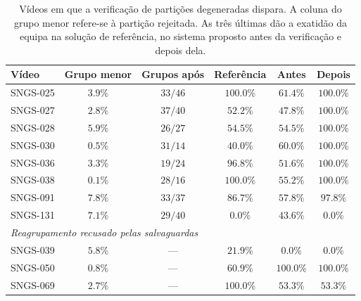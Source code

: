 \begin{table}[htbp]
    \centering
    \caption{Vídeos em que a verificação de partições degeneradas dispara. A coluna do grupo menor refere-se à partição rejeitada. As três últimas dão a exatidão da equipa na solução de referência, no sistema proposto antes da verificação e depois dela.}
    \label{tab:regressoes}
    \begin{tabular}{|l|c|c|c|c|c|}
        \hline
        \textbf{Vídeo} & \textbf{Grupo menor} & \textbf{Grupos após} & \textbf{Referência} & \textbf{Antes} & \textbf{Depois} \\
        \hline
        SNGS-025 & $3.9\%$ & $33/46$ & $100.0\%$ & $61.4\%$ & $100.0\%$ \\
        \hline
        SNGS-027 & $2.8\%$ & $37/40$ & $52.2\%$ & $47.8\%$ & $100.0\%$ \\
        \hline
        SNGS-028 & $5.9\%$ & $26/27$ & $54.5\%$ & $54.5\%$ & $100.0\%$ \\
        \hline
        SNGS-030 & $0.5\%$ & $31/14$ & $40.0\%$ & $60.0\%$ & $100.0\%$ \\
        \hline
        SNGS-036 & $3.3\%$ & $19/24$ & $96.8\%$ & $51.6\%$ & $100.0\%$ \\
        \hline
        SNGS-038 & $0.1\%$ & $28/16$ & $100.0\%$ & $55.2\%$ & $100.0\%$ \\
        \hline
        SNGS-091 & $7.8\%$ & $33/37$ & $86.7\%$ & $57.8\%$ & $97.8\%$ \\
        \hline
        SNGS-131 & $7.1\%$ & $29/40$ & $0.0\%$ & $43.6\%$ & $0.0\%$ \\
        \hline
        \multicolumn{6}{|l|}{\emph{Reagrupamento recusado pelas salvaguardas}} \\
        \hline
        SNGS-039 & $5.8\%$ & --- & $21.9\%$ & $0.0\%$ & $0.0\%$ \\
        \hline
        SNGS-050 & $0.8\%$ & --- & $60.9\%$ & $100.0\%$ & $100.0\%$ \\
        \hline
        SNGS-069 & $2.7\%$ & --- & $100.0\%$ & $53.3\%$ & $53.3\%$ \\
        \hline
    \end{tabular}
\end{table}

